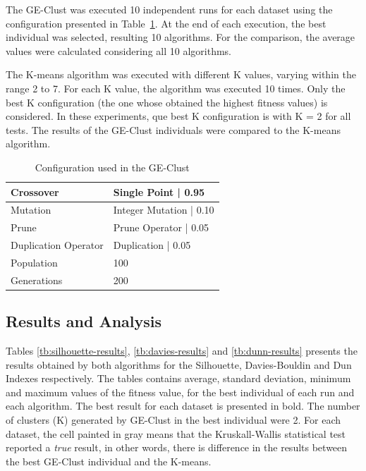 \documentclass[conference]{IEEEtran}
\begin{document}
	
	The GE-Clust was executed 10 independent runs for each dataset using the configuration presented in Table~\ref{ge-configuration}. At the end of each execution, the best individual was selected, resulting 10 algorithms. For the comparison, the average values were calculated considering all 10 algorithms.
	
	
	The K-means algorithm was executed with different K values, varying within the range 2 to 7. For each K value, the algorithm was executed 10 times. Only the best K configuration (the one whose obtained the highest fitness values) is considered. In these experiments, que best K configuration is with K = 2 for all tests. The results of the GE-Clust individuals were compared to the K-means algorithm.
	
	
	\begin{table}[]
		\centering
		\caption{Configuration used in the GE-Clust}
		\label{ge-configuration}
		\begin{tabular}{|l|l|}
			\hline
			{Crossover }           & Single Point  | 0.95     \\ \hline
			{Mutation }            & Integer Mutation   |  0.10 \\ \hline
			{Prune  }              & Prune Operator | 0.05   \\ \hline
			{Duplication Operator } & Duplication   | 0.05     \\ \hline
			{Population}                        & 100                               \\ \hline
			{Generations}                       & 200                               \\ \hline
		\end{tabular}
	\end{table}

	
	\subsection{Results and Analysis}
	
	
	Tables \ref{tb:silhouette-results}, \ref{tb:davies-results} and \ref{tb:dunn-results} presents the results obtained by both algorithms for the Silhouette, Davies-Bouldin and Dun Indexes respectively. The tables contains average, standard deviation, minimum and maximum values of the fitness value, for the best individual of each run and each algorithm. The best result for each dataset is presented in bold. The number of clusters (K) generated by GE-Clust in the best individual were 2. For each dataset, the cell painted in gray means that the Kruskall-Wallis statistical test \cite{mckight2010kruskal} reported a \textit{true} result, in other words, there is difference in the results between the best GE-Clust individual and the K-means.
		
\end{document}
